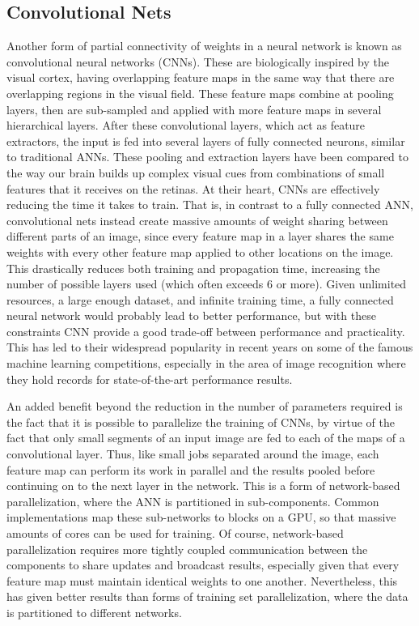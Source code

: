 \documentclass[12pt]{article}  %
\begin{document}
\subsection{Convolutional Nets}
\label{Convolutional Nets}

Another form of partial connectivity of weights in a neural network is known as convolutional neural networks (CNNs).  These are biologically inspired by the visual cortex, having overlapping feature maps in the same way that there are overlapping regions in the visual field.  These feature maps combine at pooling layers, then are sub-sampled and applied with more feature maps in several hierarchical layers.  After these convolutional layers, which act as feature extractors, the input is fed into several layers of fully connected neurons, similar to traditional ANNs.  These pooling and extraction layers have been compared to the way our brain builds up complex visual cues from combinations of small features that it receives on the retinas.  At their heart, CNNs are effectively reducing the time it takes to train.  That is, in contrast to a fully connected ANN, convolutional nets instead create massive amounts of weight sharing between different parts of an image, since every feature map in a layer shares the same weights with every other feature map applied to other locations on the image.  This drastically reduces both training and propagation time, increasing the number of possible layers used (which often exceeds 6 or more).  Given unlimited resources, a large enough dataset, and infinite training time, a fully connected neural network would probably lead to better performance, but with these constraints CNN provide a good trade-off between performance and practicality.  This has led to their widespread popularity in recent years on some of the famous machine learning competitions, especially in the area of image recognition where they hold records for state-of-the-art performance results.   

An added benefit beyond the reduction in the number of parameters required is the fact that it is possible to parallelize the training of CNNs, by virtue of the fact that only small segments of an input image are fed to each of the maps of a convolutional layer.  Thus, like small jobs separated around the image, each feature map can perform its work in parallel and the results pooled before continuing on to the next layer in the network.  This is a form of network-based parallelization, where the ANN is partitioned in sub-components.  Common implementations map these sub-networks to blocks on a GPU, so that massive amounts of cores can be used for training.  Of course, network-based parallelization requires more tightly coupled communication between the components to share updates and broadcast results, especially given that every feature map must maintain identical weights to one another.  Nevertheless, this has given better results than forms of training set parallelization, where the data is partitioned to different networks.    
\end{document}
